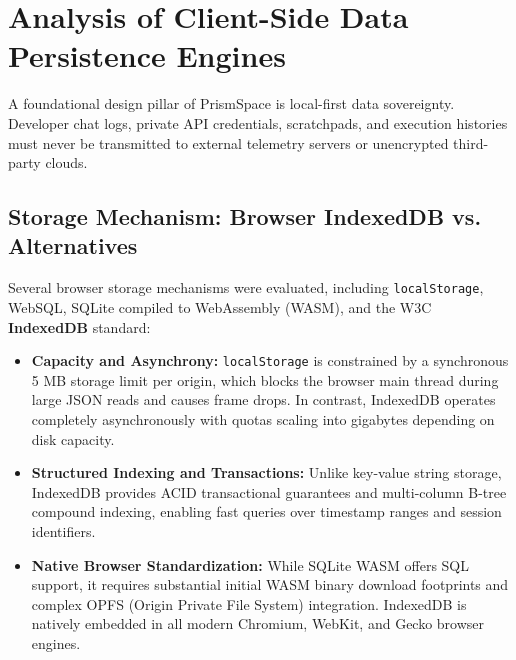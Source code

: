 \documentclass[12pt,a4paper]{report}
\begin{document}
\section{Analysis of Client-Side Data Persistence Engines}
A foundational design pillar of PrismSpace is local-first data sovereignty. Developer chat logs, private API credentials, scratchpads, and execution histories must never be transmitted to external telemetry servers or unencrypted third-party clouds.

\subsection{Storage Mechanism: Browser IndexedDB vs. Alternatives}
Several browser storage mechanisms were evaluated, including \texttt{localStorage}, WebSQL, SQLite compiled to WebAssembly (WASM), and the W3C \textbf{IndexedDB} standard:
\begin{itemize}
    \item \textbf{Capacity and Asynchrony:} \texttt{localStorage} is constrained by a synchronous 5 MB storage limit per origin, which blocks the browser main thread during large JSON reads and causes frame drops. In contrast, IndexedDB operates completely asynchronously with quotas scaling into gigabytes depending on disk capacity.
    \item \textbf{Structured Indexing and Transactions:} Unlike key-value string storage, IndexedDB provides ACID transactional guarantees and multi-column B-tree compound indexing, enabling fast queries over timestamp ranges and session identifiers.
    \item \textbf{Native Browser Standardization:} While SQLite WASM offers SQL support, it requires substantial initial WASM binary download footprints and complex OPFS (Origin Private File System) integration. IndexedDB is natively embedded in all modern Chromium, WebKit, and Gecko browser engines.
\end{itemize}
\end{document}
